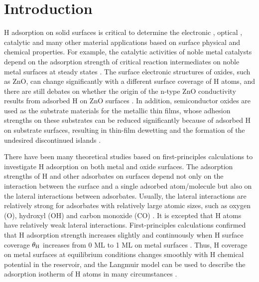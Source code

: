 \section{Introduction}

H adsorption on solid surfaces is critical to determine the electronic \cite{pearton2010recent,friend1987electronic}, optical \cite{lee2003electrical,major1986effect}, catalytic \cite{xie2011control,haruta1989gold,levy1973platinum} and many other material applications based on surface physical and chemical properties. For example, the catalytic activities of noble metal catalysts depend on the adsorption strength of critical reaction intermediates on noble metal surfaces at steady states \cite{qi2012adsorbate}. The surface electronic structures of oxides, such as ZnO, can change significantly with a different surface coverage of H atoms, and there are still debates on whether the origin of the n-type ZnO conductivity results from adsorbed H on ZnO surfaces \cite{janotti2009fundamentals}. In addition, semiconductor oxides are used as the substrate materials for the metallic thin films, whose adhesion strengths on these substrates can be reduced significantly because of adsorbed H on substrate surfaces, resulting in thin-film dewetting and the formation of the undesired discontinued islands \cite{lin2007density,duriau2006growth}.

There have been many theoretical studies based on first-principles calculations to investigate H adsorption on both metal and oxide surfaces.  The adsorption strengths of H and other adsorbates on surfaces depend not only on the interaction between the surface and a single adsorbed atom/molecule but also on the lateral interactions between adsorbates. Usually, the lateral interactions are relatively strong for adsorbates with relatively large atomic sizes, such as oxygen (O), hydroxyl (OH) and carbon monoxide (CO) \cite{Miller09,qi2012adsorbate}. It is excepted that H atoms have relatively weak lateral interactions. First-principles calculations confirmed that H adsorption strength increases slightly and continuously when H surface coverage $\theta_{\textup{H}}$ increases from 0 \ac{ML} to 1 \ac{ML} on metal surfaces \cite{pallassana1999theoretical}. Thus, H coverage on metal surfaces at equilibrium conditions changes smoothly with H chemical potential in the reservoir, and the Langmuir model can be used to describe the adsorption isotherm of H atoms in many circumstances \cite{Benard01}.


